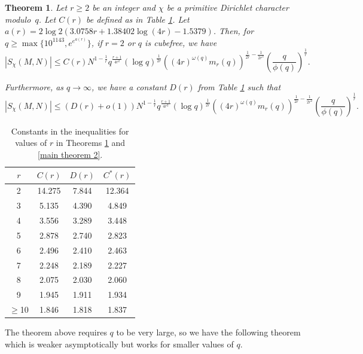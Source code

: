 \documentclass[12pt]{amsart}
\theoremstyle{plain}
\newtheorem{theorem}{Theorem}[section]
\theoremstyle{definition}
\begin{document}
\begin{theorem}\label{main thm 1}
Let $r\ge 2$ be an integer and $\chi$ be a primitive Dirichlet character modulo~$q$. Let $C(r)$ be defined as in Table \ref{Table 1}. Let $a(r) = 2\log{2}\left(3.0758r+1.38402\log(4r)-1.5379\right)$. Then, for $q \ge \max\{10^{1143},e^{e^{a(r)}}\}$, if $r=2$ or $q$ is cubefree, we have
    $$|S_{\chi}(M,N)| \le C(r)N^{1-\frac{1}{r}} q^{\frac{r+1}{4r^2}}(\log{q})^{\frac{1}{2r}}\left((4r)^{\omega(q)}m_r(q)\right)^{\frac{1}{2r}-\frac{1}{2r^2}}\left(\frac{q}{\phi(q)}\right)^{\frac{1}{r}}.$$

    Furthermore, as $q\rightarrow\infty$, we have a constant $D(r)$ from Table \ref{Table 1} such that
    $$|S_{\chi}(M,N)| \le (D(r)+o(1))N^{1-\frac{1}{r}} q^{\frac{r+1}{4r^2}}(\log{q})^{\frac{1}{2r}}\left((4r)^{\omega(q)}m_r(q)\right)^{\frac{1}{2r}-\frac{1}{2r^2}}\left(\frac{q}{\phi(q)}\right)^{\frac{1}{r}}.$$
\end{theorem}

\begin{table}[h!]
\begin{center}
  \begin{tabular}{ | c | c | c|c|}
    \hline
    $r$ & $C(r)$ & $D(r)$ & $C^*(r)$ \\ \hline
    2 & 14.275 & 7.844 &  12.364\\ \hline
    3 & 5.135 & 4.390 & 4.849\\ \hline
    4 & 3.556 & 3.289 & 3.448\\ \hline
    5 & 2.878 & 2.740 & 2.823\\ \hline
    6 & 2.496 & 2.410 & 2.463\\ \hline
    7 & 2.248 & 2.189 & 2.227\\ \hline
    8 & 2.075 & 2.030 & 2.060\\ \hline
    9 & 1.945 & 1.911 & 1.934\\ \hline
    $\ge$10 & 1.846 & 1.818 & 1.837\\ \hline
  \end{tabular}
  \caption{Constants in the inequalities for values of $r$ in Theorems \ref{main thm 1} and \ref{main theorem 2}.}\label{Table 1}
\end{center}
\end{table}

The theorem above requires $q$ to be very large, so we have the following theorem which is weaker asymptotically but works for smaller values of $q$.
\end{document}
